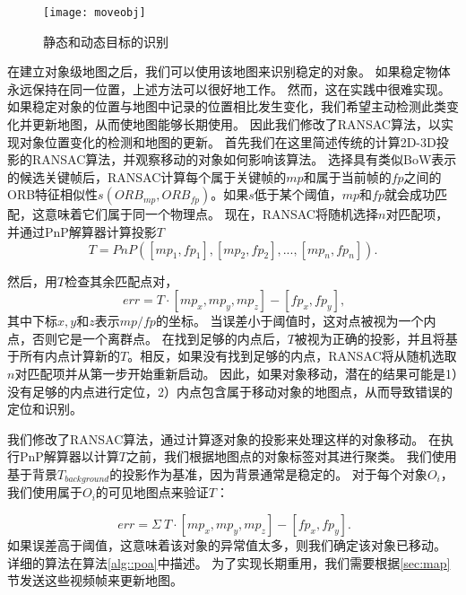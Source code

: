 \begin{figure}[htbp]
	\centering
	\texttt{[image: moveobj]}
	\caption{静态和动态目标的识别}
	\label{fig:move}
\end{figure}

在建立对象级地图之后，我们可以使用该地图来识别稳定的对象。
如果稳定物体永远保持在同一位置，上述方法可以很好地工作。
然而，这在实践中很难实现。
如果稳定对象的位置与地图中记录的位置相比发生变化，我们希望主动检测此类变化并更新地图，从而使地图能够长期使用。
因此我们修改了RANSAC算法，以实现对象位置变化的检测和地图的更新。
首先我们在这里简述传统的计算2D-3D投影的RANSAC\cite{derpanis2010overview}算法，并观察移动的对象如何影响该算法。
选择具有类似BoW表示的候选关键帧后，RANSAC计算每个属于关键帧的$mp$和属于当前帧的$fp$之间的ORB特征相似性$s(ORB_{mp}, ORB_{fp})$。如果$s$低于某个阈值，$mp$和$fp$就会成功匹配，这意味着它们属于同一个物理点。
现在，RANSAC将随机选择$n$对匹配项，并通过PnP解算器计算投影$T$
\begin{equation}\label{equ:pnp}
    T = PnP([mp_1, fp_1],[mp_2, fp_2], ..., [mp_n, fp_n]).
\end{equation} 

然后，用$T$检查其余匹配点对，
\begin{equation}\label{equ:check}
    \
    err = T \cdot [mp_x, mp_y, mp_z] - [fp_x, fp_y],
\end{equation} 
其中下标$x,y$和$z$表示$mp/fp$的坐标。
当误差小于阈值时，这对点被视为一个内点，否则它是一个离群点。
在找到足够的内点后，$T$被视为正确的投影，并且将基于所有内点计算新的$T$。相反，如果没有找到足够的内点，RANSAC将从随机选取$n$对匹配项并从第一步开始重新启动。
因此，如果对象移动，潜在的结果可能是1）没有足够的内点进行定位，2）内点包含属于移动对象的地图点，从而导致错误的定位和识别。

我们修改了RANSAC算法，通过计算逐对象的投影来处理这样的对象移动。
在执行PnP解算器以计算$T$之前，我们根据地图点的对象标签对其进行聚类。
我们使用基于背景$T_{background}$的投影作为基准，因为背景通常是稳定的。
对于每个对象$O_i$，我们使用属于$O_i$的可见地图点来验证$T$：

\begin{equation}\label{equ:gdt}
\
err = \Sigma \ T \cdot [mp_x, mp_y, mp_z] - [fp_x, fp_y].
\end{equation}
如果误差高于阈值，这意味着该对象的异常值太多，则我们确定该对象已移动。
详细的算法在算法\ref{alg::poa}中描述。
为了实现长期重用，我们需要根据\ref{sec:map}节发送这些视频帧来更新地图。


